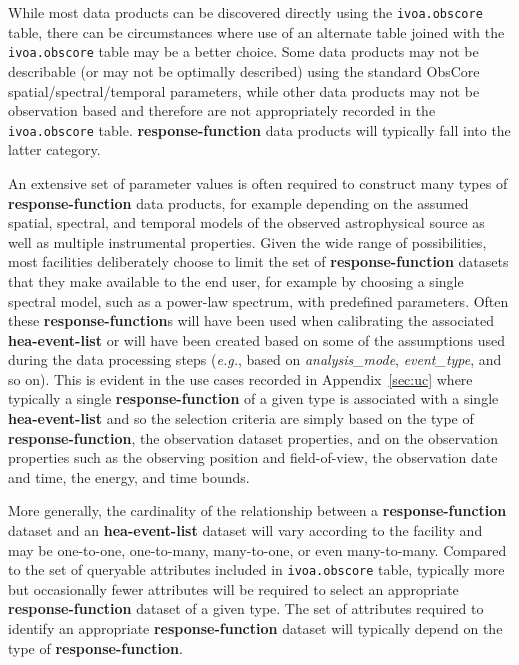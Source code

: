 
While most data products can be discovered directly using the {\tt ivoa.obscore} table, there can be circumstances where use of an alternate table joined with the {\tt ivoa.obscore} table may be a better choice.  Some data products may not be describable (or may not be optimally described) using the standard ObsCore spatial/spectral/temporal parameters, while other data products may not be observation based and therefore are not appropriately recorded in the  {\tt ivoa.obscore} table.  {\bf response-function} data products will typically fall into the latter category.

An extensive set of parameter values is often required to construct many types of  {\bf response-function} data products, for example depending on the assumed spatial, spectral, and temporal models of the observed astrophysical source as well as multiple instrumental properties.  Given the wide range of possibilities, most facilities deliberately choose to limit the set of {\bf response-function} datasets that they make available to the end user, for example by choosing a single spectral model, such as a power-law spectrum, with predefined parameters.  Often these {\bf response-function}s will have been used when calibrating the associated {\bf hea-event-list} or will have been created based on some of the assumptions used during the data processing steps ({\em e.g.\/}, based on {\em analysis\_mode\/}, {\em event\_type\/}, and so on).  This is evident in the use cases recorded in Appendix~\ref{sec:uc} where typically a single {\bf response-function} of a given type is associated with a single {\bf hea-event-list} and so the selection criteria are simply based on the type of {\bf response-function}, the observation dataset properties, and on the observation properties such as the observing position and field-of-view, the observation date and time, the energy, and time bounds.

More generally, the cardinality of the relationship between a {\bf response-function} dataset and an {\bf hea-event-list} dataset will vary according to the facility and may be one-to-one, one-to-many, many-to-one, or even many-to-many.  Compared to the set of queryable attributes included in {\tt ivoa.obscore} table, typically more but occasionally fewer attributes will be required to select an appropriate {\bf response-function} dataset of a given type.  The set of attributes required to identify an appropriate {\bf response-function} dataset will typically depend on the type of {\bf response-function}.

